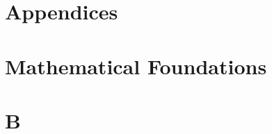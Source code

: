 \documentclass[11pt]{article}
\theoremstyle{definition}
\begin{document}
\pagebreak
\tableofcontents
\pagebreak

\pagebreak
\appendix
\clearpage
\appendix
\renewcommand{\appendixname}{}
\section*{Appendices}
\renewcommand{\thesection}{\Alph{section}}
\renewcommand{\thesubsection}{\thesection.\arabic{subsection}}
\renewcommand{\thesubsubsection}{\thesubsection.\arabic{subsubsection}}
\setcounter{section}{0}
\setcounter{subsection}{0}
\section{Mathematical Foundations}

\pagebreak

\pagebreak

\pagebreak

\pagebreak

\pagebreak

\pagebreak
\pagebreak
\section{B}

\pagebreak

\pagebreak

\pagebreak

\pagebreak

\pagebreak

\pagebreak

\end{document}
